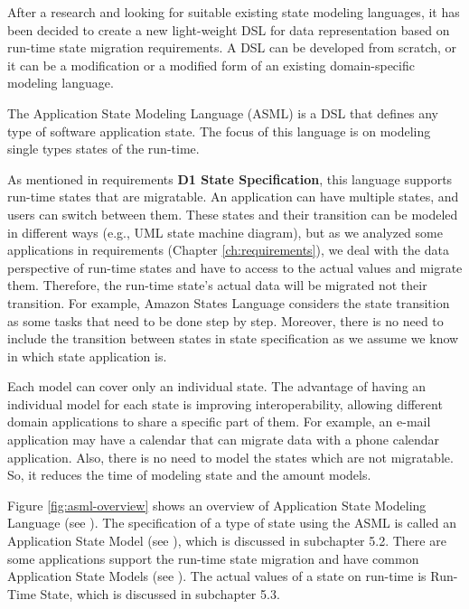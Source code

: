 After a research and looking for suitable existing state modeling languages, it has been decided to create a new light-weight DSL for data representation based on run-time state migration requirements.
A DSL can be developed from scratch, or it can be a modification or a modified form of an existing domain-specific modeling language.

The Application State Modeling Language (ASML) is a DSL that defines any type of software application state.
The focus of this language is on modeling single types states of the run-time.

As mentioned in requirements \textbf{D1 State Specification}, this language supports run-time states that are migratable.
An application can have multiple states, and users can switch between them.
These states and their transition can be modeled in different ways (e.g., UML state machine diagram), but as we analyzed some applications in requirements (Chapter \ref{ch:requirements}), we deal with the data perspective of run-time states and have to access to the actual values and migrate them. Therefore, the run-time state’s actual data will be migrated not their transition. For example, Amazon States Language considers the state transition as some tasks that need to be done step by step.
Moreover, there is no need to include the transition between states in state specification as we assume we know in which state application is. 

Each model can cover only an individual state. The advantage of having an individual model for each state is improving interoperability, allowing different domain applications to share a specific part of them.
For example, an e-mail application may have a calendar that can migrate data with a phone calendar application.
Also, there is no need to model the states which are not migratable. So, it reduces the time of modeling state and the amount models. 

Figure \ref{fig:asml-overview} shows an overview of Application State Modeling Language (see \fcircone). The specification of a type of state using the ASML is called an Application State Model (see \fcirctwo), which is discussed in subchapter 5.2. There are some applications support the run-time state migration and have common Application State Models (see \fcircthree). The  actual values of a state on run-time is Run-Time State, which is discussed in subchapter 5.3.

